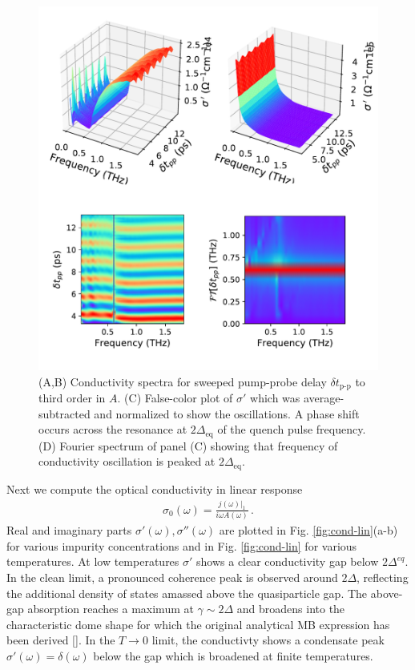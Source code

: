 \documentclass[aps,prb,reprint,noeprint,superscriptaddress]{revtex4-1}
\begin{document}
\begin{figure}[t]
	\centering
	\includegraphics[width=\columnwidth]{figures/fig3.pdf}
	\caption{(A,B) Conductivity spectra for sweeped pump-probe delay $\delta
	t_{\text{p-p}}$ to third order in $A$. (C) False-color plot of
$\sigma' $ which was average-subtracted and normalized to show the oscillations.
A phase shift occurs across the resonance at $2\Delta_{\text{eq}}$ of the quench pulse
frequency. (D) Fourier spectrum of panel (C) showing that frequency of
conductivity oscillation is peaked at $2\Delta_{\text{eq}}$.}
\label{fig:cond-pp}
\end{figure}

Next we compute the optical conductivity in linear response
\begin{eqnarray*}
  \sigma_0(\omega)\big=\frac{j(\omega)\big|_1}{i\omega A(\omega)} \,.
\end{eqnarray*}
Real and
imaginary parts $\sigma'(\omega),\sigma''(\omega)$ are plotted 
in Fig. \ref{fig:cond-lin}(a-b) for various impurity
concentrations and in Fig. \ref{fig:cond-lin} for various temperatures.
At low temperatures $\sigma'$ shows a clear conductivity gap below $2\Delta^{eq}$. 
In the clean limit, a pronounced coherence peak is observed around $2\Delta$,
reflecting the additional density of states amassed above the quasiparticle gap. 
The above-gap absorption reaches a maximum at $\gamma \sim 2\Delta$ and broadens
into the characteristic dome shape for which the original analytical MB
expression has been derived []. In the $T\rightarrow 0$ limit, the
conductivty shows a condensate peak $\sigma'(\omega)
= \delta(\omega)$ below the gap which is broadened at
finite temperatures.
\end{document}
